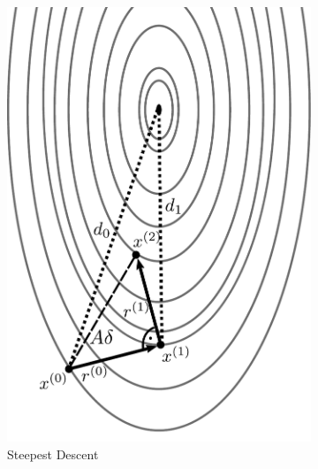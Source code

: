 \begin{figure}
\centering
\begin{subfigure}{.5\textwidth}
  \centering
  \includegraphics[width=0.9\linewidth]{chapters/2_solvers/2_3_iterative_solvers/figures/steepest_descent.pdf}
  \caption{Steepest Descent}
  \label{fig:steepest_descent}
\end{subfigure}%
\begin{subfigure}{.5\textwidth}
  \centering

\end{subfigure}
\end{figure}
